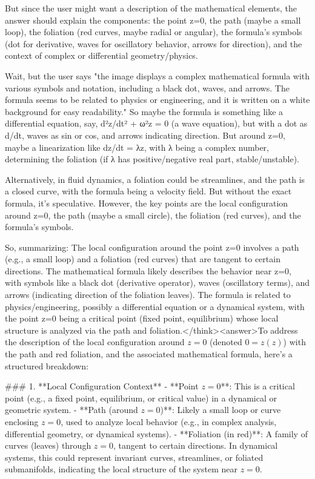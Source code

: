 But since the user might want a description of the mathematical elements, the answer should explain the components: the point z=0, the path (maybe a small loop), the foliation (red curves, maybe radial or angular), the formula's symbols (dot for derivative, waves for oscillatory behavior, arrows for direction), and the context of complex or differential geometry/physics.

Wait, but the user says "the image displays a complex mathematical formula with various symbols and notation, including a black dot, waves, and arrows. The formula seems to be related to physics or engineering, and it is written on a white background for easy readability." So maybe the formula is something like a differential equation, say, d²z/dt² + ω²z = 0 (a wave equation), but with a dot as d/dt, waves as sin or cos, and arrows indicating direction. But around z=0, maybe a linearization like dz/dt = λz, with λ being a complex number, determining the foliation (if λ has positive/negative real part, stable/unstable).

Alternatively, in fluid dynamics, a foliation could be streamlines, and the path is a closed curve, with the formula being a velocity field. But without the exact formula, it's speculative. However, the key points are the local configuration around z=0, the path (maybe a small circle), the foliation (red curves), and the formula's symbols.

So, summarizing: The local configuration around the point z=0 involves a path (e.g., a small loop) and a foliation (red curves) that are tangent to certain directions. The mathematical formula likely describes the behavior near z=0, with symbols like a black dot (derivative operator), waves (oscillatory terms), and arrows (indicating direction of the foliation leaves). The formula is related to physics/engineering, possibly a differential equation or a dynamical system, with the point z=0 being a critical point (fixed point, equilibrium) whose local structure is analyzed via the path and foliation.</think><answer>To address the description of the local configuration around \( z = 0 \) (denoted \( 0 = z(z) \)) with the path and red foliation, and the associated mathematical formula, here’s a structured breakdown:  


### 1. **Local Configuration Context**  
- **Point \( z = 0 \)**: This is a critical point (e.g., a fixed point, equilibrium, or critical value) in a dynamical or geometric system.  
- **Path (around \( z = 0 \))**: Likely a small loop or curve enclosing \( z = 0 \), used to analyze local behavior (e.g., in complex analysis, differential geometry, or dynamical systems).  
- **Foliation (in red)**: A family of curves (leaves) through \( z = 0 \), tangent to certain directions. In dynamical systems, this could represent invariant curves, streamlines, or foliated submanifolds, indicating the local structure of the system near \( z = 0 \).  



